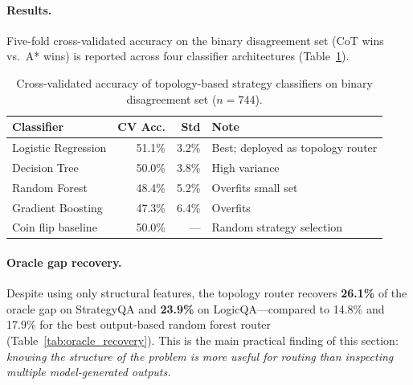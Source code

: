 \documentclass[11pt]{article}
\begin{document}
\paragraph{Results.}
Five-fold cross-validated accuracy on the binary disagreement set (CoT wins vs.\ A* wins) is reported across four classifier architectures (Table~\ref{tab:topo_clf}).

\begin{table}[t]
\centering
\caption{Cross-validated accuracy of topology-based strategy classifiers on binary disagreement set ($n=744$).}
\label{tab:topo_clf}
\small
\begin{tabular}{lrrl}
\toprule
\textbf{Classifier} & \textbf{CV Acc.} & \textbf{Std} & \textbf{Note} \\
\midrule
Logistic Regression & 51.1\% & 3.2\% & Best; deployed as topology router \\
Decision Tree       & 50.0\% & 3.8\% & High variance \\
Random Forest       & 48.4\% & 5.2\% & Overfits small set \\
Gradient Boosting   & 47.3\% & 6.4\% & Overfits \\
Coin flip baseline  & 50.0\% & ---   & Random strategy selection \\
\bottomrule
\end{tabular}
\end{table}

\paragraph{Oracle gap recovery.}
Despite using only structural features, the topology router recovers \textbf{26.1\%} of the oracle gap on StrategyQA and \textbf{23.9\%} on LogicQA—compared to 14.8\% and 17.9\% for the best output-based random forest router (Table~\ref{tab:oracle_recovery}). This is the main practical finding of this section: \emph{knowing the structure of the problem is more useful for routing than inspecting multiple model-generated outputs.}
\end{document}
